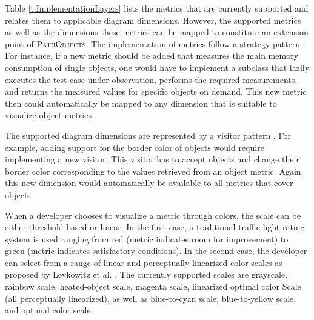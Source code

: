 Table \ref{t:ImplementationLayers} lists the metrics that are currently supported and relates them to applicable diagram dimensions.
However, the supported metrics as well as the dimensions these metrics can be mapped to constitute an extension point of \textsc{PathObjects}.
The implementation of metrics follow a strategy pattern \cite{gamma_design_1995}.
For instance, if a new metric should be added that measures the main memory consumption of single objects, one would have to implement a subclass that lazily executes the test case under observation, performs the required measurements, and returns the measured values for specific objects on demand.
This new metric then could automatically be mapped to any dimension that is suitable to visualize object metrics.

The supported diagram dimensions are represented by a visitor pattern \cite{gamma_design_1995}.
For example, adding support for the border color of objects would require implementing a new visitor.
This visitor has to accept objects and change their border color corresponding to the values retrieved from an object metric.
Again, this new dimension would automatically be available to all metrics that cover objects.

When a developer chooses to visualize a metric through colors, the scale can be either threshold-based or linear.
In the first case, a traditional traffic light rating system is used ranging from red (metric indicates room for improvement) to green (metric indicates satisfactory conditions).
In the second case, the developer can select from a range of linear and perceptually linearized color scales as proposed by Levkowitz et al. \cite{levkowitz_color_1992, levkowitz_color_1997}.
The currently supported scales are grayscale, rainbow scale, heated-object scale, magenta scale, linearized optimal color Scale (all perceptually linearized), as well as blue-to-cyan scale, blue-to-yellow scale, and optimal color scale.

